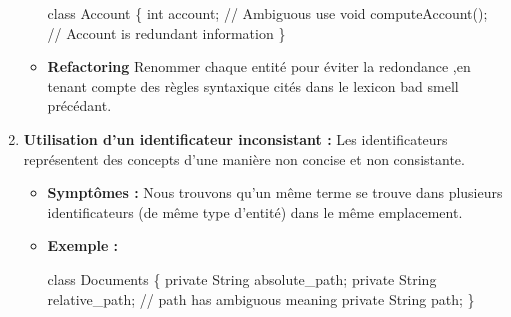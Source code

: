 \begin{enumerate}
\begin{itemize}
 \begin{framed}
 {\selectfont
class Account \{ \newline
int account; // Ambiguous use \newline
void computeAccount();\newline
// Account is redundant information \newline
\}
}
  \end{framed}   
  \item \textbf{Refactoring}
Renommer chaque entité pour éviter la redondance ,en tenant compte des règles syntaxique cités dans le lexicon bad smell précédant.
\end{itemize}
\newline
\item \textbf {Utilisation d’un identificateur inconsistant :}
Les identificateurs représentent des concepts d’une manière non concise et non consistante.
\begin{itemize}
\item \textbf {Symptômes :}
Nous trouvons qu’un même terme se trouve dans plusieurs identificateurs (de même type d’entité) dans le même emplacement.
\item \textbf {Exemple :}


\begin{framed}
 {\selectfont
class Documents  \{ \newline
private String absolute\_path;\newline
private String relative\_path;\newline
// path has ambiguous meaning\newline
private String path;\newline
\}
}
  \end{framed}   


\end{itemize}
\end{enumerate}
